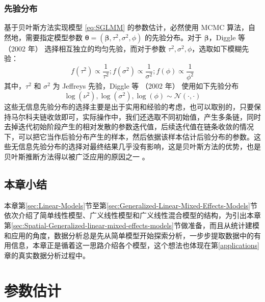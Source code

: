 \documentclass[12pt,a4paper,UTF8,twoside]{book}
\theoremstyle{definition}
\theoremstyle{definition}
\theoremstyle{definition}
\theoremstyle{remark}
\begin{document}
\hypertarget{subsec:prior-sglmm}{%
\subsection{先验分布}\label{subsec:prior-sglmm}}

基于贝叶斯方法实现模型 \eqref{eq:SGLMM} 的参数估计，必然使用 MCMC
算法，自然地，需要指定模型参数
\(\boldsymbol{\theta} = (\boldsymbol{\beta},\tau^2,\sigma^2,\phi)\)
的先验分布。对于 \(\boldsymbol{\beta}\)，Diggle 等 （2002 年）
\citep{Diggle2002Childhood} 选择相互独立的均匀先验，而对于参数
\(\tau^2,\sigma^2,\phi\)，选取如下模糊先验：
\[f(\tau^2) \propto \frac{1}{\tau^2};f(\sigma^2) \propto \frac{1}{\sigma^2};f(\phi) \propto \frac{1}{\phi^2}\]
\noindent 其中，\(\tau^2\) 和 \(\sigma^2\) 为 Jeffreys 先验，Diggle 等
（2002 年） \citep{Diggle2002Childhood} 使用如下先验分布
\begin{equation*}
\log(\nu^2),\log(\sigma^2),\log(\phi)  \sim \mathcal{N}(\cdot,\cdot)
\end{equation*}
这些无信息先验分布的选择主要是出于实用和经验的考虑，也可以取别的，只要保持马尔科夫链收敛即可，实际操作中，我们还选取不同初始值，产生多条链，同时去掉迭代初始阶段产生的相对发散的参数迭代值，后续迭代值在链条收敛的情况下，可以把它当作后验分布产生的样本，然后依据该样本估计后验分布的参数。这些无信息先验分布的选择对最终结果几乎没有影响，这是贝叶斯方法的优势，也是贝叶斯推断方法得以被广泛应用的原因之一
\citep{mao2006}。

\hypertarget{sec:models}{%
\section{本章小结}\label{sec:models}}

本章第\ref{sec:Linear-Models}节至第\ref{sec:Generalized-Linear-Mixed-Effects-Models}节依次介绍了简单线性模型、广义线性模型和广义线性混合模型的结构，为引出本章第\ref{sec:Spatial-Generalized-linear-mixed-effects-models}节做准备，而且从统计建模和应用的角度，数据分析总是先从简单模型开始探索分析，一步步提取数据中的有用信息，本章正是循着这一思路介绍各个模型，这个想法也体现在第\ref{applications}章的真实数据分析过程中。

\hypertarget{algorithms}{%
\chapter{参数估计}\label{algorithms}}
\end{document}
